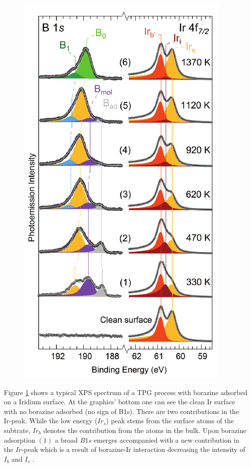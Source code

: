 \begin{figure}
 \includegraphics[width=0.9\linewidth]{./images/07571n_fig5.png}
 \caption{\cite{orlando_epitaxial_2012}}
\label{fig:borazine-TPG-on-Ir}
\end{figure}

Figure \ref{fig:borazine-TPG-on-Ir} shows a typical XPS spectrum of a TPG process with borazine adsorbed on a Iridium surface. At the graphics' bottom one can see the clean Ir surface with no borazine adsorbed (no sign of B1s). There are two contributions in the Ir-peak. While the low energy ($Ir_s$) peak stems from the surface atoms of the subtrate, $Ir_b$ denotes the contribution from the atoms in the bulk. Upon borazine adsorption $(1)$ a broad $B1s$ emerges accompanied with a new contribution in the $Ir$-peak which is a result of borazine-Ir interaction decreasing the intensity of $I_b$ and $I_s$ .

